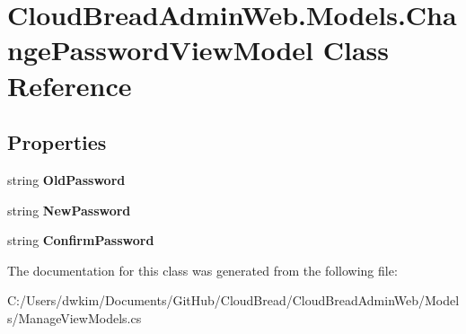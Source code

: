\hypertarget{a00064}{}\section{Cloud\+Bread\+Admin\+Web.\+Models.\+Change\+Password\+View\+Model Class Reference}
\label{a00064}
\subsection*{Properties}
\begin{DoxyCompactItemize}
\item 
string {\bfseries Old\+Password}\hypertarget{a00064_ad13c5856dd47f45c11abf687622dd72b}{}\label{a00064_ad13c5856dd47f45c11abf687622dd72b}

\item 
string {\bfseries New\+Password}\hypertarget{a00064_a57f7addf7cf3000d14eba846774ae494}{}\label{a00064_a57f7addf7cf3000d14eba846774ae494}

\item 
string {\bfseries Confirm\+Password}\hypertarget{a00064_ab3ce99d097dc66a28bb1757726a9e7f3}{}\label{a00064_ab3ce99d097dc66a28bb1757726a9e7f3}

\end{DoxyCompactItemize}


The documentation for this class was generated from the following file\+:\begin{DoxyCompactItemize}
\item 
C\+:/\+Users/dwkim/\+Documents/\+Git\+Hub/\+Cloud\+Bread/\+Cloud\+Bread\+Admin\+Web/\+Models/Manage\+View\+Models.\+cs\end{DoxyCompactItemize}
